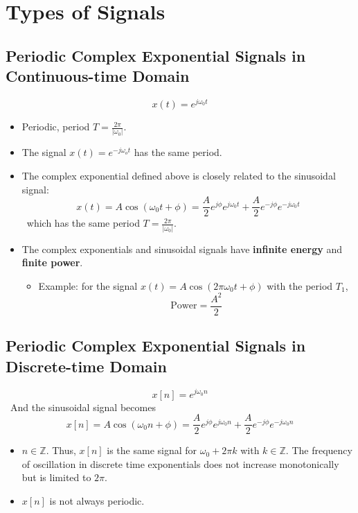 \section{Types of Signals}
\subsection{Periodic Complex Exponential Signals in Continuous-time Domain}

 \[ x(t) = e^{j\omega_0 t} \]
\begin{itemize}
 \item Periodic, period $T = \frac{2\pi}{\lvert \omega_0 \rvert}$.
 \item The signal $x(t) = e^{-j\omega_o t}$ has the same period.
 \item The complex exponential defined above is closely related to the sinusoidal signal:
 \[ x(t) = A \cos(\omega_0 t + \phi) = \frac{A}{2} e^{j\phi}e^{j \omega_0 t} +\frac{A}{2} e^{-j\phi}e^{-j \omega_0 t} \]
  \ which has the same period $T = \frac{2\pi}{\lvert \omega_0 \rvert}$.
 \item The complex exponentials and sinusoidal signals have \textbf{infinite energy} and \textbf{finite
  power}.
 \begin{itemize}
  \item Example: for the signal $x(t)= A \cos(2\pi \omega_{0}t+\phi)$ with the period $T_{1}$,
  \[ \text{Power} = \frac{A^{2}}{2} \]
 \end{itemize}
\end{itemize}

\subsection{Periodic Complex Exponential Signals in Discrete-time Domain}

 \[ x[n] = e^{j\omega_0 n} \]
 \ And the sinusoidal signal becomes 
 \[ x[n] = A \cos(\omega_0 n + \phi) = \frac{A}{2} e^{j\phi}e^{j \omega_0 n} +\frac{A}{2} e^{-j\phi}e^{-j
  \omega_0 n} \]
 \begin{itemize}
  \item $n \in \mathbb{Z}$. Thus, $x[n]$ is the same signal for $\omega_0 + 2\pi k$ with $k \in
   \mathbb{Z}$. The frequency of oscillation in discrete time exponentials does not increase
   monotonically but is limited to $2\pi$.
  \item $x[n]$ is not always periodic.
 \end{itemize}
 
